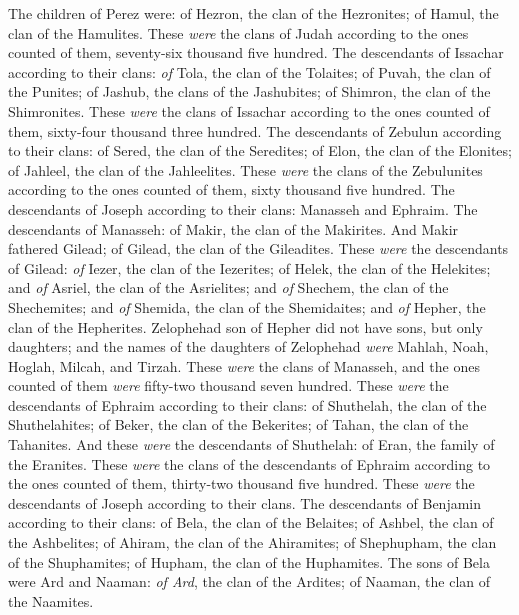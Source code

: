 \begin{biblechapter}
\verse The children of Perez were: of Hezron, the clan of the Hezronites; of Hamul, the clan of the Hamulites.
\verse These \textit{were} the clans of Judah according to the ones counted of them, seventy-six thousand five hundred.
\verse The descendants of Issachar according to their clans: \textit{of} Tola, the clan of the Tolaites; of Puvah, the clan of the Punites;
\verse of Jashub, the clans of the Jashubites; of Shimron, the clan of the Shimronites.
\verse These \textit{were} the clans of Issachar according to the ones counted of them, sixty-four thousand three hundred.
\verse The descendants of Zebulun according to their clans: of Sered, the clan of the Seredites; of Elon, the clan of the Elonites; of Jahleel, the clan of the Jahleelites.
\verse These \textit{were} the clans of the Zebulunites according to the ones counted of them, sixty thousand five hundred.
\verse The descendants of Joseph according to their clans: Manasseh and Ephraim.
\verse The descendants of Manasseh: of Makir, the clan of the Makirites. And Makir fathered Gilead; of Gilead, the clan of the Gileadites.
\verse These \textit{were} the descendants of Gilead: \textit{of} Iezer, the clan of the Iezerites; of Helek, the clan of the Helekites;
\verse and \textit{of} Asriel, the clan of the Asrielites; and \textit{of} Shechem, the clan of the Shechemites;
\verse and \textit{of} Shemida, the clan of the Shemidaites; and \textit{of} Hepher, the clan of the Hepherites.
\verse Zelophehad son of Hepher did not have sons, but only daughters; and the names of the daughters of Zelophehad \textit{were} Mahlah, Noah, Hoglah, Milcah, and Tirzah.
\verse These \textit{were} the clans of Manasseh, and the ones counted of them \textit{were} fifty-two thousand seven hundred.
\verse These \textit{were} the descendants of Ephraim according to their clans: of Shuthelah, the clan of the Shuthelahites; of Beker, the clan of the Bekerites; of Tahan, the clan of the Tahanites.
\verse And these \textit{were} the descendants of Shuthelah: of Eran, the family of the Eranites.
\verse These \textit{were} the clans of the descendants of Ephraim according to the ones counted of them, thirty-two thousand five hundred. These \textit{were} the descendants of Joseph according to their clans.
\verse The descendants of Benjamin according to their clans: of Bela, the clan of the Belaites; of Ashbel, the clan of the Ashbelites; of Ahiram, the clan of the Ahiramites;
\verse of Shephupham, the clan of the Shuphamites; of Hupham, the clan of the Huphamites.
\verse The sons of Bela were Ard and Naaman: \textit{of Ard}, the clan of the Ardites; of Naaman, the clan of the Naamites.

\end{biblechapter}
